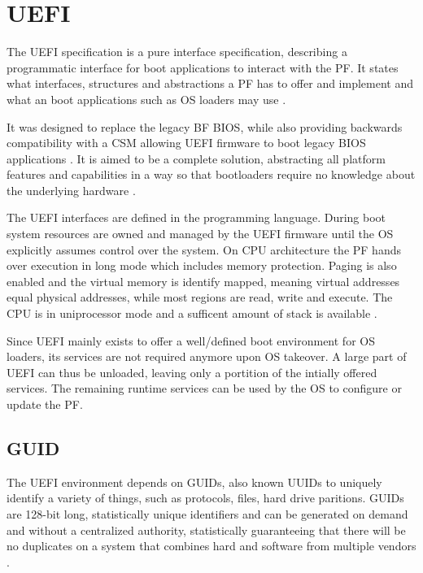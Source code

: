 
\section{\acf{UEFI}}

The \ac{UEFI} specification is a pure interface specification, describing a programmatic interface for boot applications to interact with the \ac{PF}.
It states what interfaces, structures and abstractions a \ac{PF} has to offer and implement and what an boot applications such as \ac{OS} loaders may use \cite{beyond-bios}.

It was designed to replace the legacy \acl{BF} \ac{BIOS}, while also providing backwards compatibility with a \acf{CSM} allowing \ac{UEFI} firmware to boot legacy \ac{BIOS} applications \cite{beyond-bios}.
It is aimed to be a complete solution, abstracting all platform features and capabilities in a way so that bootloaders require no knowledge about the underlying hardware \cite[1.3]{uefi-spec}.

The \ac{UEFI} interfaces are defined in the  programming language.
During boot system resources are owned and managed by the \ac{UEFI} firmware until the \ac{OS} explicitly assumes control over the system.
On  \ac{CPU} architecture the \ac{PF} hands over execution in  long mode which includes memory protection.
Paging is also enabled and the virtual memory is identify mapped, meaning virtual addresses equal physical addresses, while most regions are read, write and execute.
The \ac{CPU} is in uniprocessor mode and a sufficent amount of stack is available \cite[Section 2.3.4]{uefi-spec}.

Since \ac{UEFI} mainly exists to offer a well\-/defined boot environment for \ac{OS} loaders, its services are not required anymore upon \ac{OS} takeover.
A large part of \ac{UEFI} can thus be unloaded, leaving only a portition of the intially offered services.
The remaining runtime services can be used by the \ac{OS} to configure or update the \ac{PF}.

\subsection{\acf{GUID}}

The \ac{UEFI} environment depends on \acp{GUID}, also known \acp{UUID} to uniquely identify a variety of things, such as protocols, files, hard drive paritions.
\acp{GUID} are 128-bit long, statistically unique identifiers and can be generated on demand and without a centralized authority, statistically guaranteeing that there will be no duplicates on a system that combines hard and software from multiple vendors \cite{rfc-4122}.

